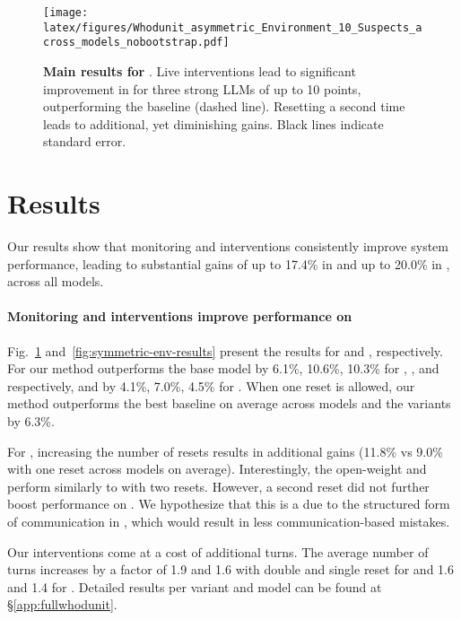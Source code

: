 

\begin{figure}[t]
    \centering
        \texttt{[image: latex/figures/Whodunit\_asymmetric\_Environment\_10\_Suspects\_across\_models\_nobootstrap.pdf]}
        \caption{\textbf{Main results for \ourenvasym{}}. Live interventions lead to significant improvement in \success{} for three strong LLMs of up to 10 points, outperforming the baseline (dashed line). Resetting a second time leads to additional, yet diminishing gains.  Black lines indicate standard error.}
        \label{fig:asymmetric-env-results}
\end{figure}





\section{Results}
\label{sec:results}

Our results show that monitoring and interventions consistently improve system performance, leading to substantial gains of up to 17.4\% in \ourenv{} and up to 20.0\% in \govsim{}, across all models.


\paragraph{Monitoring and interventions improve performance on \ourenv{}}
Fig.~\ref{fig:asymmetric-env-results} and~\ref{fig:symmetric-env-results} present the results for \ourenvasym{} and \ourenvsym{}, respectively. For \ourenvasym{} our method outperforms the base model by 6.1\%, 10.6\%, 10.3\% for \gpt{}, \llama{}, and \qwen{} respectively, and by 4.1\%, 7.0\%, 4.5\% for \ourenvsym{}. When one reset is allowed, our method outperforms the best baseline on average across models and the variants by 6.3\%.


For \ourenvasym{}, increasing the number of resets results in additional gains (11.8\% vs 9.0\% with one reset across models on average). Interestingly, the open-weight \qwen{} and \llama{} perform similarly to \gpt{} with two resets.
However, a second reset did not further boost performance on \ourenvsym{}. We hypothesize that this is a due to the structured form of communication in \ourenvsym{}, which would result in less communication-based mistakes.

Our interventions come at a cost of additional turns. The average number of turns increases by a factor of 1.9 and 1.6 with double and single reset for \ourenvasym{} and 1.6 and 1.4 for \ourenvsym{}.
Detailed results per variant and model can be found at \S\ref{app:fullwhodunit}.



